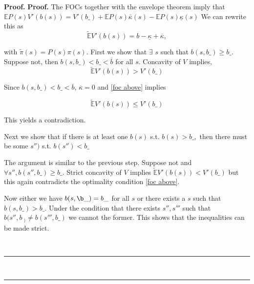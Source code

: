 \documentclass[thmsb,11pt]{article}
\newenvironment{proof}[1][Proof]{\noindent \textbf{#1.} }{\  \rule{0.5em}{0.5em}}
\begin{document}
\begin{proof}
\begin{proof}
The FOCs together with the envelope theorem imply that $\mathbb{E}P(s)V'(b(s))=V'(b\_)+\mathbb{E}P(s)\bar{\kappa}(s)-\mathbb{E}P(s)\underline{\kappa}(s)$
We can rewrite this as
\begin{equation}
\label{foc above}
\mathbb{\tilde{E}}V'(b(s))=b-\underline{\kappa}+\overline{\kappa},
\end{equation}

with $\tilde{\pi}(s)=P(s)\pi(s)$. First we show that $\exists$ $s$ such that $b(s,b\_)\geq b\_$. Suppose not, then $b(s,b\_)<b\_<\overline{b}$ for all $s$. Concavity of $V$ implies,
\[\mathbb{\tilde{E}}V'(b(s))>V'(b\_)\]

Since  $b(s,b\_)<b\_<\overline{b}$, $\overline{\kappa}=0$ and \eqref{foc above} implies

\[\mathbb{\tilde{E}}V'(b(s))\leq V'(b\_) \]

This yields a contradiction.

Next we show that if there is at least one $b\left( s\right) $ s.t. $b\left(
s\right) >b\_,$ then there must be some $%
s'')$ s.t. $b\left( s''\right) <b\_$ 

The argument is similar to the previous step. Suppose not and $\forall s'', b(s'',b\_)\geq b\_$. Strict concavity of $V$ implies $\mathbb{\tilde{E}}V'(b(s))<V'(b\_)$ but this again contradicts the optimality condition \eqref{foc above}.

Now either we have $b(s,\b\_)=b\_$ for all $s$ or there exists a $s$ such that $b(s,b\_)>b\_$. Under the condition that there exists $s'',s'''$ such that $b(s'',b\
_)\neq b(s''',b\_)$ we cannot the former. This shows that the inequalities can be made strict.

\end{proof}



\end{proof}
\end{document}
